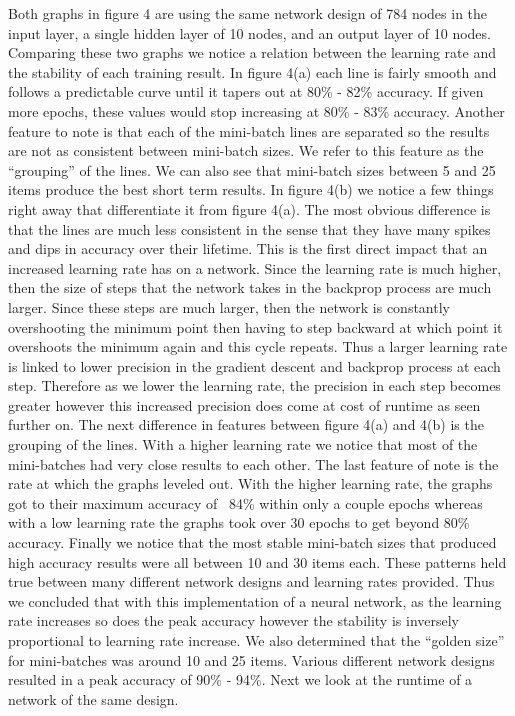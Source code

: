 \documentclass[12pt]{article}
\theoremstyle{definition}
\theoremstyle{plain}
\begin{document}
Both graphs in figure 4 are using the same network design of 784 nodes in the input layer, a single hidden layer of 10 nodes, and an output layer of 10 nodes. Comparing these two graphs we notice a relation between the learning rate and the stability of each training result. In figure 4(a) each line is fairly smooth and follows a predictable curve until it tapers out at 80\% \-- 82\% accuracy. If given more epochs, these values would stop increasing at 80\% \-- 83\% accuracy. Another feature to note is that each of the mini-batch lines are separated so the results are not as consistent between mini-batch sizes. We refer to this feature as the ``grouping'' of the lines. We can also see that mini-batch sizes between 5 and 25 items produce the best short term results. In figure 4(b) we notice a few things right away that differentiate it from figure 4(a). The most obvious difference is that the lines are much less consistent in the sense that they have many spikes and dips in accuracy over their lifetime. This is the first direct impact that an increased learning rate has on a network. Since the learning rate is much higher, then the size of steps that the network takes in the backprop process are much larger. Since these steps are much larger, then the network is constantly overshooting the minimum point then having to step backward at which point it overshoots the minimum again and this cycle repeats. Thus a larger learning rate is linked to lower precision in the gradient descent and backprop process at each step. Therefore as we lower the learning rate, the precision in each step becomes greater however this increased precision does come at cost of runtime as seen further on. The next difference in features between figure 4(a) and 4(b) is the grouping of the lines. With a higher learning rate we notice that most of the mini-batches had very close results to each other. The last feature of note is the rate at which the graphs leveled out. With the higher learning rate, the graphs got to their maximum accuracy of ~84\% within only a couple epochs whereas with a low learning rate the graphs took over 30 epochs to get beyond 80\% accuracy. Finally we notice that the most stable mini-batch sizes that produced high accuracy results were all between 10 and 30 items each. These patterns held true between many different network designs and learning rates provided. Thus we concluded that with this implementation of a neural network, as the learning rate increases so does the peak accuracy however the stability is inversely proportional to learning rate increase. We also determined that the ``golden size'' for mini-batches was around 10 and 25 items. Various different network designs resulted in a peak accuracy of 90\% \-- 94\%. Next we look at the runtime of a network of the same design.
\end{document}
